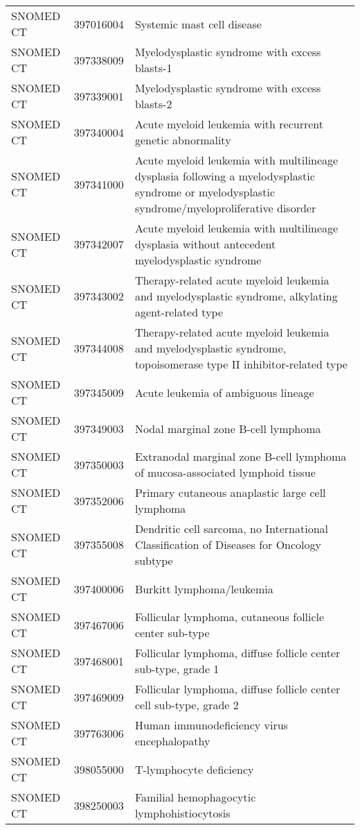 \begin{longtable}{p{}p{}p{}}
  SNOMED CT & 397016004 & Systemic mast cell disease \\ 
  SNOMED CT & 397338009 & Myelodysplastic syndrome with excess blasts-1 \\ 
  SNOMED CT & 397339001 & Myelodysplastic syndrome with excess blasts-2 \\ 
  SNOMED CT & 397340004 & Acute myeloid leukemia with recurrent genetic abnormality \\ 
  SNOMED CT & 397341000 & Acute myeloid leukemia with multilineage dysplasia following a myelodysplastic syndrome or myelodysplastic syndrome/myeloproliferative disorder \\ 
  SNOMED CT & 397342007 & Acute myeloid leukemia with multilineage dysplasia without antecedent myelodysplastic syndrome \\ 
  SNOMED CT & 397343002 & Therapy-related acute myeloid leukemia and myelodysplastic syndrome, alkylating agent-related type \\ 
  SNOMED CT & 397344008 & Therapy-related acute myeloid leukemia and myelodysplastic syndrome, topoisomerase type II inhibitor-related type \\ 
  SNOMED CT & 397345009 & Acute leukemia of ambiguous lineage \\ 
  SNOMED CT & 397349003 & Nodal marginal zone B-cell lymphoma \\ 
  SNOMED CT & 397350003 & Extranodal marginal zone B-cell lymphoma of mucosa-associated lymphoid tissue \\ 
  SNOMED CT & 397352006 & Primary cutaneous anaplastic large cell lymphoma \\ 
  SNOMED CT & 397355008 & Dendritic cell sarcoma, no International Classification of Diseases for Oncology subtype \\ 
  SNOMED CT & 397400006 & Burkitt lymphoma/leukemia \\ 
  SNOMED CT & 397467006 & Follicular lymphoma, cutaneous follicle center sub-type \\ 
  SNOMED CT & 397468001 & Follicular lymphoma, diffuse follicle center sub-type, grade 1 \\ 
  SNOMED CT & 397469009 & Follicular lymphoma, diffuse follicle center cell sub-type, grade 2 \\ 
  SNOMED CT & 397763006 & Human immunodeficiency virus encephalopathy \\ 
  SNOMED CT & 398055000 & T-lymphocyte deficiency \\ 
  SNOMED CT & 398250003 & Familial hemophagocytic lymphohistiocytosis \\ 

\end{longtable}
